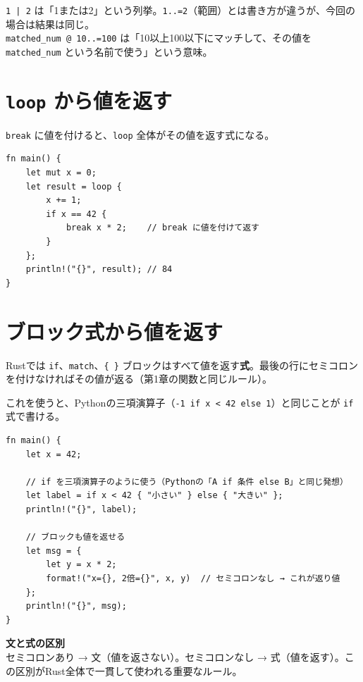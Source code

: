 \documentclass[12pt,a4paper]{article}
\begin{document}
\begin{notebox}
\texttt{1 | 2} は「1または2」という列挙。\texttt{1..=2}（範囲）とは書き方が違うが、今回の場合は結果は同じ。\\
\texttt{matched\_num @ 10..=100} は「10以上100以下にマッチして、その値を \texttt{matched\_num} という名前で使う」という意味。
\end{notebox}

\section{\texttt{loop} から値を返す}

\texttt{break} に値を付けると、\texttt{loop} 全体がその値を返す式になる。

\begin{lstlisting}
fn main() {
    let mut x = 0;
    let result = loop {
        x += 1;
        if x == 42 {
            break x * 2;    // break に値を付けて返す
        }
    };
    println!("{}", result); // 84
}
\end{lstlisting}

\section{ブロック式から値を返す}

Rustでは \texttt{if}、\texttt{match}、\texttt{\{ \}} ブロックはすべて値を返す\textbf{式}。最後の行にセミコロンを付けなければその値が返る（第1章の関数と同じルール）。

これを使うと、Pythonの三項演算子（\texttt{-1 if x < 42 else 1}）と同じことが \texttt{if} 式で書ける。

\begin{lstlisting}
fn main() {
    let x = 42;

    // if を三項演算子のように使う（Pythonの「A if 条件 else B」と同じ発想）
    let label = if x < 42 { "小さい" } else { "大きい" };
    println!("{}", label);

    // ブロックも値を返せる
    let msg = {
        let y = x * 2;
        format!("x={}, 2倍={}", x, y)  // セミコロンなし → これが返り値
    };
    println!("{}", msg);
}
\end{lstlisting}

\begin{pointbox}
\textbf{文と式の区別}\\
セミコロンあり → 文（値を返さない）。セミコロンなし → 式（値を返す）。この区別がRust全体で一貫して使われる重要なルール。
\end{pointbox}
\end{document}
